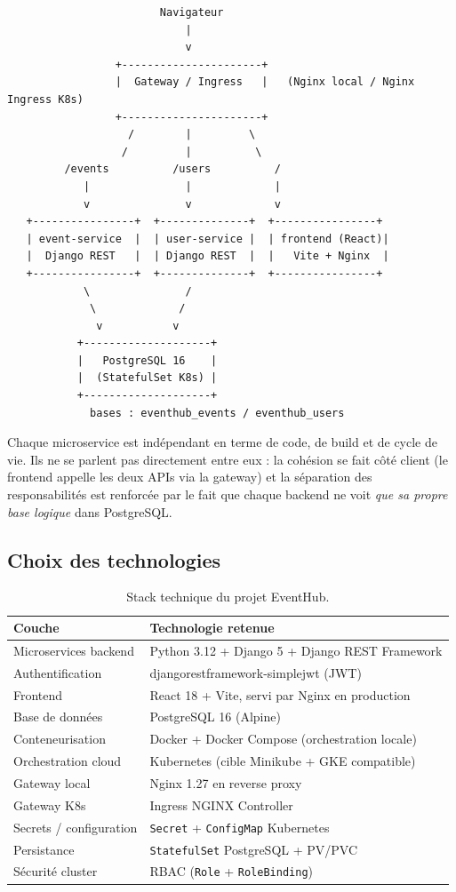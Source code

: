 \documentclass[11pt,a4paper]{article}
\newcommand{\code}[1]{\texttt{#1}}
\begin{document}
\begin{verbatim}
                        Navigateur
                            |
                            v
                 +----------------------+
                 |  Gateway / Ingress   |   (Nginx local / Nginx Ingress K8s)
                 +----------------------+
                   /        |         \
                  /         |          \
         /events          /users          /
            |               |             |
            v               v             v
   +----------------+  +--------------+  +----------------+
   | event-service  |  | user-service |  | frontend (React)|
   |  Django REST   |  | Django REST  |  |   Vite + Nginx  |
   +----------------+  +--------------+  +----------------+
            \               /
             \             /
              v           v
           +--------------------+
           |   PostgreSQL 16    |
           |  (StatefulSet K8s) |
           +--------------------+
             bases : eventhub_events / eventhub_users
\end{verbatim}

Chaque microservice est indépendant en terme de code, de build et de cycle de vie. Ils ne se parlent pas directement entre eux : la cohésion se fait côté client (le frontend appelle les deux APIs via la gateway) et la séparation des responsabilités est renforcée par le fait que chaque backend ne voit \emph{que sa propre base logique} dans PostgreSQL.

\subsection{Choix des technologies}

\begin{table}[H]
\centering
\begin{tabular}{ll}
\toprule
Couche & Technologie retenue \\
\midrule
Microservices backend   & Python 3.12 + Django 5 + Django REST Framework \\
Authentification        & djangorestframework-simplejwt (JWT) \\
Frontend                & React 18 + Vite, servi par Nginx en production \\
Base de données         & PostgreSQL 16 (Alpine) \\
Conteneurisation        & Docker + Docker Compose (orchestration locale) \\
Orchestration cloud     & Kubernetes (cible Minikube + GKE compatible) \\
Gateway local           & Nginx 1.27 en reverse proxy \\
Gateway K8s             & Ingress NGINX Controller \\
Secrets / configuration & \code{Secret} + \code{ConfigMap} Kubernetes \\
Persistance             & \code{StatefulSet} PostgreSQL + PV/PVC \\
Sécurité cluster        & RBAC (\code{Role} + \code{RoleBinding}) \\
\bottomrule
\end{tabular}
\caption{Stack technique du projet EventHub.}
\end{table}
\end{document}
